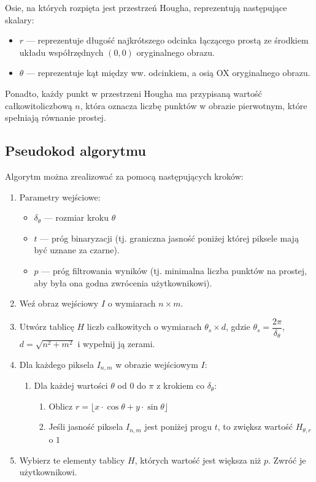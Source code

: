 \documentclass[10pt]{article} %
\begin{document}
Osie, na których rozpięta jest przestrzeń Hougha, reprezentują następujące skalary:
\begin{itemize}
\item $r$ --- reprezentuje długość najkrótszego odcinka łączącego prostą ze środkiem układu współrzędnych $(0, 0)$ oryginalnego obrazu.
\item $\theta$ --- reprezentuje kąt między ww. odcinkiem, a osią OX oryginalnego obrazu.
\end{itemize}
 
Ponadto, każdy punkt w przestrzeni Hougha ma przypisaną wartość całkowitoliczbową $n$, która oznacza liczbę punktów w obrazie pierwotnym, które spełniają równanie prostej.

\subsection{Pseudokod algorytmu}\label{pseudokod}

Algorytm można zrealizować za pomocą następujących kroków:
\begin{enumerate}
\item Parametry wejściowe: 
 \begin{itemize}
   \item $\delta_\theta$ --- rozmiar kroku $\theta$
   \item $t$ --- próg binaryzacji (tj. graniczna jasność poniżej której piksele mają być uznane za czarne). 
   \item $p$ --- próg filtrowania wyników (tj. minimalna liczba punktów na prostej, aby była ona godna zwrócenia użytkownikowi).
 \end{itemize}
\item Weź obraz wejściowy $I$ o wymiarach $n\times m$.
\item Utwórz tablicę $H$ liczb całkowitych o wymiarach $\theta_s \times d$, gdzie $\theta_s = \dfrac{2\pi}{\delta_\theta}$, $d=\sqrt{n^2+m^2}$ i wypełnij ją zerami.
\item Dla każdego piksela $I_{n,m}$ w obrazie wejściowym $I$:
  \begin{enumerate}
    \item Dla każdej wartości $\theta$ od $0$ do $\pi$ z krokiem co $\delta_\theta$:
  		\begin{enumerate}
    		\item Oblicz $r = \lfloor x \cdot \cos \theta + y \cdot \sin \theta \rfloor$
    		\item Jeśli jasność piksela $I_{n,m}$ jest poniżej progu $t$, to zwiększ wartość $H_{\theta, r}$ o $1$
  		\end{enumerate}
  \end{enumerate}
\item Wybierz te elementy tablicy $H$, których wartość jest większa niż $p$. Zwróć je użytkownikowi.
\end{enumerate}
\end{document}

